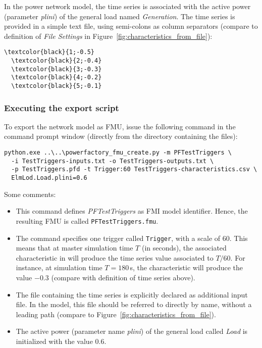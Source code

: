 In the power network model, the time series is associated with the active power (parameter \emph{plini}) of the general load named \emph{Generation}. The time series is provided in a simple text file, using semi-colons as column separators (compare to definition of \emph{File Settings} in Figure~\ref{fig:characteristics_from_file}):
\begin{Verbatim}[frame=single,commandchars=\\\{\}]
  \textcolor{black}{1;-0.5}
  \textcolor{black}{2;-0.4}
  \textcolor{black}{3;-0.3}
  \textcolor{black}{4;-0.2}
  \textcolor{black}{5;-0.1}
\end{Verbatim}

\subsubsection*{Executing the export script}

To export the network model as FMU, issue the following command in the command prompt window (directly from the directory containing the files):
\begin{verbatim}
python.exe ..\..\powerfactory_fmu_create.py -m PFTestTriggers \
  -i TestTriggers-inputs.txt -o TestTriggers-outputs.txt \
  -p TestTriggers.pfd -t Trigger:60 TestTriggers-characteristics.csv \
  ElmLod.Load.plini=0.6
\end{verbatim}
Some comments:
\begin{itemize}
  \item This command defines \emph{PFTestTriggers} as FMI model identifier.
  Hence, the resulting FMU is called \texttt{PFTestTriggers.fmu}.
  \item The command specifies one trigger called \texttt{Trigger}, with a scale of 60.
  This means that at master simulation time $T$ (in seconds), the associated characteristic in \pf will produce the time series value associated to $T/60$.
  For instance, at simulation time $T=180\,$s, the characteristic will produce the value $-0.3$ (compare with definition of time series above).
  \item The file containing the time series is explicitly declared as additional input file.
  In the \pf model, this file should be referred to directly by name, without a leading path (compare to Figure~\ref{fig:characteristics_from_file}).
  \item The active power (parameter name \emph{plini}) of the general load called \emph{Load} is initialized with the value $0.6$.
\end{itemize}


